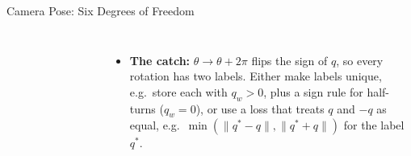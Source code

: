 \begin{frame}{Camera Pose: Six Degrees of Freedom}
\begin{columns}[T,onlytextwidth]
{\begin{tabular}{>{\raggedright\arraybackslash}p{1.55cm} p{0.75cm} >{\raggedright\arraybackslash}p{4.1cm}}
        \bottomrule
      \end{tabular}\par}
      \vspace{0.6em}
      \begin{itemize}\footnotesize\itemsep0.3em
        \item \textbf{The catch:} $\theta\to\theta+2\pi$ flips the sign of $q$, so every rotation has two labels. Either make labels unique, e.g.\ store each with $q_w>0$, plus a sign rule for half-turns ($q_w=0$), or use a loss that treats $q$ and $-q$ as equal, e.g.\ $\min(\lVert q^{*}-q\rVert,\lVert q^{*}+q\rVert)$ for the label $q^{*}$.
      \end{itemize}
  \end{columns}
\end{frame}


